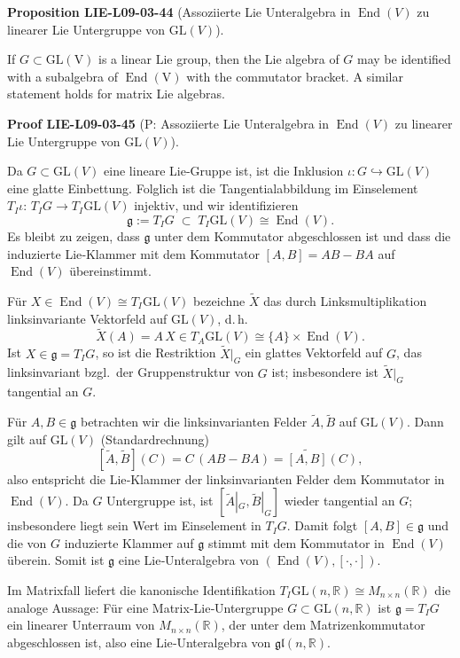 \documentclass[10pt, letterpaper]{article}
\newcommand{\R}{\mathbb{R}}
\newcommand{\GL}{\mathrm{GL}}
\newcommand{\CustomHeading}[3]{%
  \par\medskip\noindent%
  \textbf{#1 #2} \textnormal{(#3)}.\enskip%
}
\newenvironment{PROP}[2]{\CustomHeading{Proposition}{#1}{#2}}{}
\newenvironment{PROOF}[2]{\CustomHeading{Proof}{#1}{#2}}{}
\begin{document}
\begin{PROP}{LIE-L09-03-44}{Assoziierte Lie Unteralgebra in $\operatorname{End}(V)$ zu linearer Lie Untergruppe von $\GL(V)$}
If $G \subset \mathrm{GL}(\mathrm{V})$ is a linear Lie group, then the Lie algebra of $G$ may be identified with a subalgebra of $\operatorname{End}(\mathrm{V})$ with the commutator bracket. A similar statement holds for matrix Lie algebras.
\end{PROP}

\begin{PROOF}{LIE-L09-03-45}{P: Assoziierte Lie Unteralgebra in $\operatorname{End}(V)$ zu linearer Lie Untergruppe von $\GL(V)$}
Da $G\subset \GL(V)$ eine lineare Lie‐Gruppe ist, ist die Inklusion
$\iota:G\hookrightarrow \GL(V)$ eine glatte Einbettung. Folglich ist die
Tangentialabbildung im Einselement $T_I\iota:\,T_I G\to T_I\GL(V)$ injektiv,
und wir identifizieren
\[
\mathfrak g:=T_I G \;\subset\; T_I\GL(V)\cong \operatorname{End}(V).
\]
Es bleibt zu zeigen, dass $\mathfrak g$ unter dem Kommutator abgeschlossen ist
und dass die induzierte Lie‐Klammer mit dem Kommutator $[A,B]=AB-BA$
auf $\operatorname{End}(V)$ übereinstimmt.

Für $X\in \operatorname{End}(V)\cong T_I\GL(V)$ bezeichne $\widetilde X$ das durch Linksmultiplikation
linksinvariante Vektorfeld auf $\GL(V)$, d.\,h.
\[
\widetilde X(A)=A\,X\in T_A\GL(V)\cong \{A\}\times \operatorname{End}(V).
\]
Ist $X\in \mathfrak g=T_I G$, so ist die Restriktion $\widetilde X|_{G}$ ein glattes
Vektorfeld auf $G$, das linksinvariant bzgl.\ der Gruppenstruktur von $G$ ist;
insbesondere ist $\widetilde X|_{G}$ tangential an $G$.

Für $A,B\in \mathfrak g$ betrachten wir die linksinvarianten Felder
$\widetilde A,\widetilde B$ auf $\GL(V)$. Dann gilt auf $\GL(V)$ (Standardrechnung)
\[
[\widetilde A,\widetilde B](C)=C\,(AB-BA)
= \widetilde{[A,B]}(C),
\]
also entspricht die Lie‐Klammer der linksinvarianten Felder dem Kommutator
in $\operatorname{End}(V)$. Da $G$ Untergruppe ist, ist $[\widetilde A|_G,\widetilde B|_G]$
wieder tangential an $G$; insbesondere liegt sein Wert im Einselement in $T_I G$.
Damit folgt $[A,B]\in \mathfrak g$ und die von $G$ induzierte Klammer auf
$\mathfrak g$ stimmt mit dem Kommutator in $\operatorname{End}(V)$ überein. Somit ist
$\mathfrak g$ eine Lie‐Unteralgebra von $(\operatorname{End}(V),[\cdot,\cdot])$.

Im Matrixfall liefert die kanonische Identifikation
$T_I\GL(n,\R)\cong M_{n\times n}(\R)$ die analoge Aussage: Für eine
Matrix‐Lie‐Untergruppe $G\subset \GL(n,\R)$ ist $\mathfrak g=T_I G$ ein
linearer Unterraum von $M_{n\times n}(\R)$, der unter dem Matrizenkommutator
abgeschlossen ist, also eine Lie‐Unteralgebra von $\mathfrak{gl}(n,\R)$.
\end{PROOF}
\end{document}
